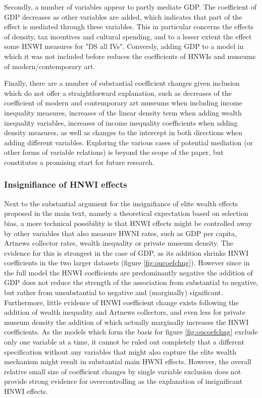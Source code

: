 \documentclass[11pt, authoryear]{elsarticle}
\begin{document}
Secondly, a number of variables appear to partly mediate GDP.
The coefficient of GDP decreases as other variables are added, which indicates that part of the effect is mediated through these variables.
This in particular concerns the effects of density, tax incentives and cultural spending, and to a lesser extent the effect some HNWI measures for "DS all IVs".
Conversly, adding GDP to a model in which it was not included before reduces the coefficients of HNWIs and museums of modern/contemporary art.


Finally, there are a number of substantial coefficient changes given inclusion which do not offer a straightforward explanation, such as decreases of the coefficient of modern and contemporary art museums when including income inequality measures, increases of the linear density term when adding wealth inequality variables, increases of income inequality coefficients when adding density measures, as well as changes to the intercept in both directions when adding different variables. 
Exploring the various cases of potential mediation (or other forms of variable relations) is beyond the scope of the paper, but constitutes a promising start for future research.



\subsubsection{Insignifiance of HNWI effects}


Next to the substantial argument for the insignifiance of elite wealth effects proposed in the main text, namely a theoretical expectation based on selection bias, a more technical possibility is that HNWI effects might be controlled away by other variables that also measure HWNI rates, such as GDP per capita, Artnews collector rates, wealth inequality or private museum density.
The evidence for this is strongest in the case of GDP, as its addition shrinks HNWI coefficients in the two larger datasets (figure \ref{fig:oucoefchng}).
However since in the full model the HNWI coefficients are predominantly negative the addition of GDP does not reduce the strength of the association from substantial to negative, but rather from unsubstantial to negative and (marginally) significant. 
Furthermore, little evidence of HNWI coefficient change exists following the addition of wealth inequality and Artnews collectors, and even less for private museum density the addition of which actually marginally increases the HNWI coefficients.
As the models which form the basis for figure \ref{fig:oucoefchng} exclude only one variable at a time, it cannot be ruled out completely that a different specification without any variables that might also capture the elite wealth mechanism might result in substantial main HWNI effects.
However, the overall relative small size of coefficient changes by single variable exclusion does not provide strong evidence for overcontrolling as the explanation of insignificant HNWI effects. 
\end{document}
